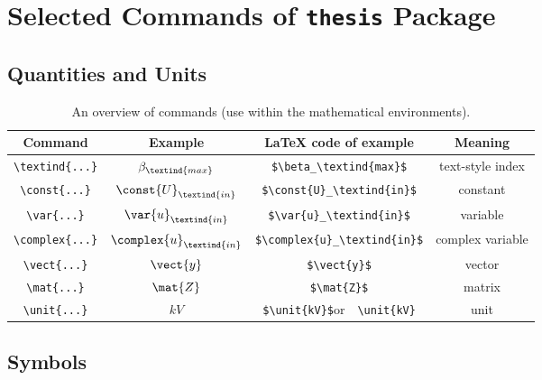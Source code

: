 \chapter{Selected Commands of \texttt{thesis} Package}

\section{Quantities and Units}

\begin{table}[!h]
  \caption[An overview of commands]{An overview of commands (use within the mathematical environments).}
  \begin{center}
  	\small
	  \begin{tabular}{|c|c|c|c|}
	    \hline
	    Command    						& Example 					& \LaTeX{} code of example  							& Meaning  \\
	    \hline\hline
	    \verb|\textind{...}|	& $\beta_\textind{max}$ 	& \verb|$\beta_\textind{max}$|	& text-style index \\
	    \hline
	    \verb|\const{...}| 		& $\const{U}_\textind{in}$ 				& \verb|$\const{U}_\textind{in}$|		& constant \\
	    \hline
	    \verb|\var{...}| 		& $\var{u}_\textind{in}$ & \verb|$\var{u}_\textind{in}$| & variable \\
	    \hline
	    \verb|\complex{...}| 	& $\complex{u}_\textind{in}$ & \verb|$\complex{u}_\textind{in}$| & complex variable\\
	    \hline
	    \verb|\vect{...}| 		& $\vect{y}$ 						& \verb|$\vect{y}$| & vector \\
	    \hline
	    \verb|\mat{...}| 	& $\mat{Z}$ 						& \verb|$\mat{Z}$| & matrix \\
	    \hline
	    \verb|\unit{...}| 		& $\unit{kV}$ 						& \verb|$\unit{kV}$|\quad or\ \, \verb|\unit{kV}| & unit \\
	    \hline
	  \end{tabular}
  \end{center}
\end{table}



\section{Symbols}

